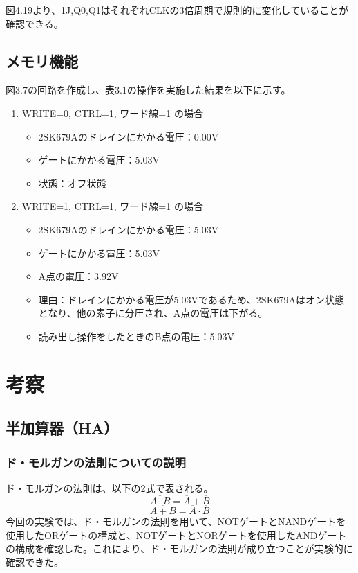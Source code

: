 \documentclass{jlreq}
\numberwithin{equation}{section}
\begin{document}
図4.19より、1J,Q0,Q1はそれぞれCLKの3倍周期で規則的に変化していることが確認できる。

\subsection{メモリ機能}
図3.7の回路を作成し、表3.1の操作を実施した結果を以下に示す。
\begin{enumerate}
  \item WRITE=0, CTRL=1, ワード線=1 の場合
  \begin{itemize}
    \item 2SK679Aのドレインにかかる電圧：0.00V
    \item ゲートにかかる電圧：5.03V
    \item 状態：オフ状態
  \end{itemize}
  \item WRITE=1, CTRL=1, ワード線=1 の場合
  \begin{itemize}
    \item 2SK679Aのドレインにかかる電圧：5.03V
    \item ゲートにかかる電圧：5.03V
    \item A点の電圧：3.92V
    \item 理由：ドレインにかかる電圧が5.03Vであるため、2SK679Aはオン状態となり、他の素子に分圧され、A点の電圧は下がる。
    \item 読み出し操作をしたときのB点の電圧：5.03V
  \end{itemize}
\end{enumerate}

\section{考察}

\subsection{半加算器（HA）}
\subsubsection{ド・モルガンの法則についての説明}
ド・モルガンの法則は、以下の2式で表される。
\begin{equation}
  \overline{A \cdot B} = \overline{A} + \overline{B}
\end{equation}
\begin{equation}
  \overline{A + B} = \overline{A} \cdot \overline{B}
\end{equation}
今回の実験では、ド・モルガンの法則を用いて、NOTゲートとNANDゲートを使用したORゲートの構成と、NOTゲートとNORゲートを使用したANDゲートの構成を確認した。これにより、ド・モルガンの法則が成り立つことが実験的に確認できた。
\end{document}
